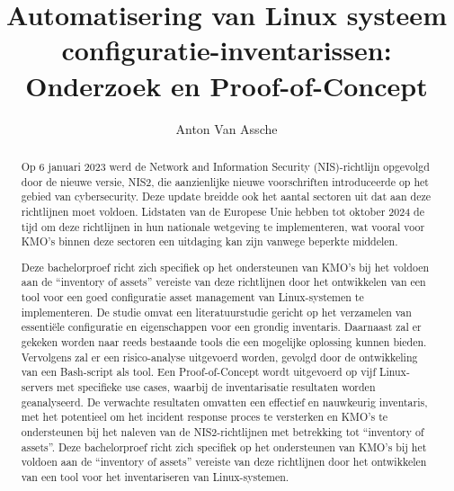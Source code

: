 \documentclass{hogent-article}
\title{Automatisering van Linux systeem configuratie-inventarissen: Onderzoek en Proof-of-Concept}
\author{Anton Van Assche}
\begin{document}
\begin{abstract}
    Op 6 januari 2023 werd de Network and Information Security (NIS)-richtlijn opgevolgd door de nieuwe versie, NIS2, die aanzienlijke nieuwe voorschriften introduceerde op het gebied van cybersecurity.
    Deze update breidde ook het aantal sectoren uit dat aan deze richtlijnen moet voldoen.
    Lidstaten van de Europese Unie hebben tot oktober 2024 de tijd om deze richtlijnen in hun nationale wetgeving te implementeren, wat vooral voor KMO's binnen deze sectoren een uitdaging kan zijn vanwege beperkte middelen.
    \newline

    Deze bachelorproef richt zich specifiek op het ondersteunen van KMO's bij het voldoen aan de ``inventory of assets'' vereiste van deze richtlijnen door het ontwikkelen van een tool voor een goed configuratie asset management van Linux-systemen te implementeren.
    De studie omvat een literatuurstudie gericht op het verzamelen van essenti\"ele configuratie en eigenschappen voor een grondig inventaris. Daarnaast zal er gekeken worden naar reeds bestaande tools die een mogelijke oplossing kunnen bieden.
    Vervolgens zal er een risico-analyse uitgevoerd worden, gevolgd door de ontwikkeling van een Bash-script als tool.
    Een Proof-of-Concept wordt uitgevoerd op vijf Linux-servers met specifieke use cases, waarbij de inventarisatie resultaten worden geanalyseerd.
    De verwachte resultaten omvatten een effectief en nauwkeurig inventaris, met het potentieel om het incident response proces te versterken en KMO's te ondersteunen bij het naleven van de NIS2-richtlijnen met betrekking tot ``inventory of assets''.
    Deze bachelorproef richt zich specifiek op het ondersteunen van KMO's bij het voldoen aan de ``inventory of assets'' vereiste van deze richtlijnen door het ontwikkelen van een tool voor het inventariseren van Linux-systemen.
\end{abstract}

\tableofcontents



\printbibliography[heading=bibintoc]
\end{document}
